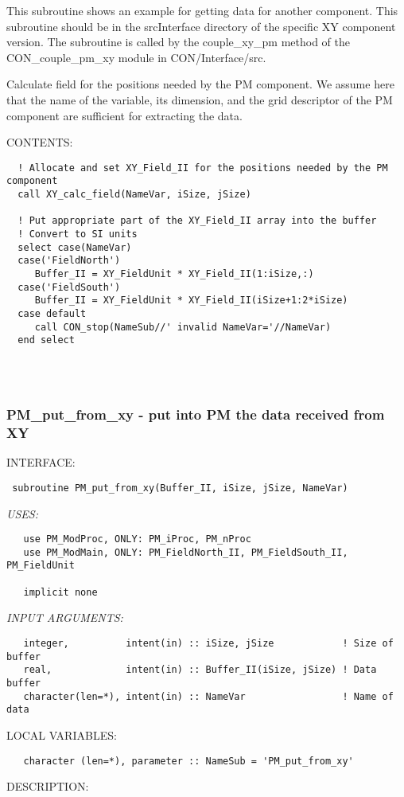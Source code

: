      This subroutine shows an example for getting data for another component.
     This subroutine should be in the srcInterface directory of the
     specific XY component version. The subroutine is called by the
     couple\_xy\_pm method of the CON\_couple\_pm\_xy module in 
     CON/Interface/src.
    
     Calculate field for the positions needed by the PM component.
     We assume here that the name of the variable, its dimension,
     and the grid descriptor of the PM component are 
     sufficient for extracting the data.


\bigskip
{\sf CONTENTS:}
\begin{verbatim}
  ! Allocate and set XY_Field_II for the positions needed by the PM component
  call XY_calc_field(NameVar, iSize, jSize)

  ! Put appropriate part of the XY_Field_II array into the buffer
  ! Convert to SI units
  select case(NameVar)
  case('FieldNorth')
     Buffer_II = XY_FieldUnit * XY_Field_II(1:iSize,:)
  case('FieldSouth')
     Buffer_II = XY_FieldUnit * XY_Field_II(iSize+1:2*iSize)
  case default
     call CON_stop(NameSub//' invalid NameVar='//NameVar)
  end select
 
\end{verbatim}
 
 
\mbox{}\hrulefill\ 
 
\newpage


\subsubsection{ PM\_put\_from\_xy - put into PM the data received from XY }


\bigskip
{\sf INTERFACE:}
\begin{verbatim} subroutine PM_put_from_xy(Buffer_II, iSize, jSize, NameVar)
 \end{verbatim}
{\em USES:}
\begin{verbatim}   use PM_ModProc, ONLY: PM_iProc, PM_nProc
   use PM_ModMain, ONLY: PM_FieldNorth_II, PM_FieldSouth_II, PM_FieldUnit
 
   implicit none\end{verbatim}
{\em INPUT ARGUMENTS:}
\begin{verbatim}   integer,          intent(in) :: iSize, jSize            ! Size of buffer
   real,             intent(in) :: Buffer_II(iSize, jSize) ! Data buffer
   character(len=*), intent(in) :: NameVar                 ! Name of data
 \end{verbatim}
{\sf LOCAL VARIABLES:}
\begin{verbatim}   character (len=*), parameter :: NameSub = 'PM_put_from_xy'
 \end{verbatim}
{\sf DESCRIPTION:}\\
 
